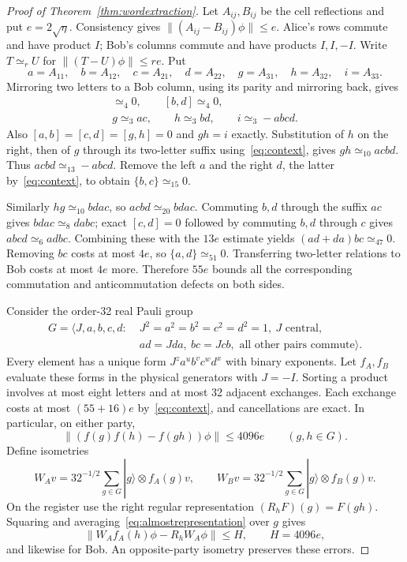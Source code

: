 \begin{proof}[Proof of Theorem~\ref{thm:wordextraction}]
Let $A_{ij},B_{ij}$ be the cell reflections and put $e=2\sqrt\eta$.
Consistency gives $\|(A_{ij}-B_{ij})\phi\|\leq e$. Alice's rows commute
and have product $I$; Bob's columns commute and have products $I,I,-I$.
Write $T\simeq_r U$ for $\|(T-U)\phi\|\leq re$. Put
\[
a=A_{11},\quad b=A_{12},\quad c=A_{21},\quad d=A_{22},\quad
g=A_{31},\quad h=A_{32},\quad i=A_{33}.
\]
Mirroring two letters to a Bob column, using its parity and mirroring back,
gives
\begin{gather*}
[a,c]\simeq_4 0,\qquad [b,d]\simeq_4 0,\\
g\simeq_3 ac,\qquad h\simeq_3 bd,\qquad i\simeq_3-abcd.
\end{gather*}
Also $[a,b]=[c,d]=[g,h]=0$ and $gh=i$ exactly. Substitution of $h$ on
the right, then of $g$ through its two-letter suffix using~\eqref{eq:context},
gives $gh\simeq_{10}acbd$. Thus $acbd\simeq_{13}-abcd$.
Remove the left $a$ and the right $d$, the latter by~\eqref{eq:context},
to obtain $\{b,c\}\simeq_{15}0$.

Similarly $hg\simeq_{10}bdac$, so $acbd\simeq_{20}bdac$.
Commuting $b,d$ through the suffix $ac$ gives $bdac\simeq_8 dabc$;
exact $[c,d]=0$ followed by commuting $b,d$ through $c$ gives
$abcd\simeq_6 adbc$. Combining these with the $13e$ estimate yields
$(ad+da)bc\simeq_{47}0$. Removing $bc$ costs at most $4e$, so
$\{a,d\}\simeq_{51}0$. Transferring two-letter relations to Bob costs
at most $4e$ more. Therefore $55e$ bounds all the corresponding
commutation and anticommutation defects on both sides.

Consider the order-32 real Pauli group
\[
\begin{split}
G=\langle J,a,b,c,d:\;&J^2=a^2=b^2=c^2=d^2=1,\ J\text{ central},\\
&ad=Jda,\ bc=Jcb,\text{ all other pairs commute}\rangle.
\end{split}
\]
Every element has a unique form $J^za^ub^vc^wd^x$ with binary exponents.
Let $f_A,f_B$ evaluate these forms in the physical generators with $J=-I$.
Sorting a product involves at most eight letters and at most 32 adjacent
exchanges. Each exchange costs at most $(55+16)e$ by~\eqref{eq:context},
and cancellations are exact. In particular, on either party,
\begin{equation}\label{eq:almostrepresentation}
\|(f(g)f(h)-f(gh))\phi\|\leq4096e\qquad(g,h\in G).
\end{equation}
Define isometries
\[
W_Av=32^{-1/2}\sum_{g\in G}|g\rangle\otimes f_A(g)v,
\qquad W_Bv=32^{-1/2}\sum_{g\in G}|g\rangle\otimes f_B(g)v.
\]
On the register use the right regular representation
$(R_hF)(g)=F(gh)$. Squaring and averaging~\eqref{eq:almostrepresentation}
over $g$ gives
\begin{equation}\label{eq:regularintertwining}
\|W_Af_A(h)\phi-R_hW_A\phi\|\leq H,\qquad H=4096e,
\end{equation}
and likewise for Bob. An opposite-party isometry preserves these errors.


\end{proof}
